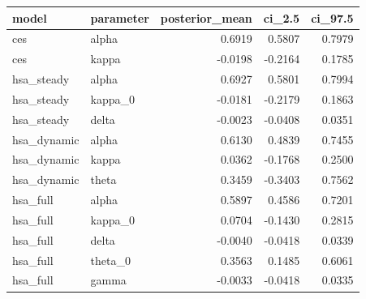 \begin{tabular}{llrrr}
\toprule
model & parameter & posterior\_mean & ci\_2.5 & ci\_97.5 \\
\midrule
ces & alpha & 0.6919 & 0.5807 & 0.7979 \\
ces & kappa & -0.0198 & -0.2164 & 0.1785 \\
hsa\_steady & alpha & 0.6927 & 0.5801 & 0.7994 \\
hsa\_steady & kappa\_0 & -0.0181 & -0.2179 & 0.1863 \\
hsa\_steady & delta & -0.0023 & -0.0408 & 0.0351 \\
hsa\_dynamic & alpha & 0.6130 & 0.4839 & 0.7455 \\
hsa\_dynamic & kappa & 0.0362 & -0.1768 & 0.2500 \\
hsa\_dynamic & theta & 0.3459 & -0.3403 & 0.7562 \\
hsa\_full & alpha & 0.5897 & 0.4586 & 0.7201 \\
hsa\_full & kappa\_0 & 0.0704 & -0.1430 & 0.2815 \\
hsa\_full & delta & -0.0040 & -0.0418 & 0.0339 \\
hsa\_full & theta\_0 & 0.3563 & 0.1485 & 0.6061 \\
hsa\_full & gamma & -0.0033 & -0.0418 & 0.0335 \\
\bottomrule
\end{tabular}

